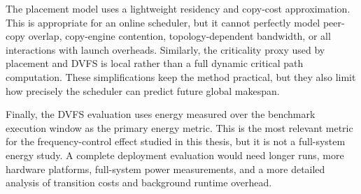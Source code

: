 The placement model uses a lightweight residency and copy-cost approximation.
This is appropriate for an online scheduler, but it cannot perfectly model
peer-copy overlap, copy-engine contention, topology-dependent bandwidth, or
all interactions with launch overheads. Similarly, the criticality
proxy used by placement and DVFS is local rather than a full dynamic critical
path computation. These simplifications keep the method practical, but they
also limit how precisely the scheduler can predict future global makespan.

Finally, the DVFS evaluation uses energy measured over the benchmark execution
window as the primary energy metric. This is the most relevant metric for the
frequency-control effect studied in this thesis, but it is not a full-system
energy study. A complete deployment evaluation would need longer runs, more
hardware platforms, full-system power measurements, and a more detailed
analysis of transition costs and background runtime overhead.
